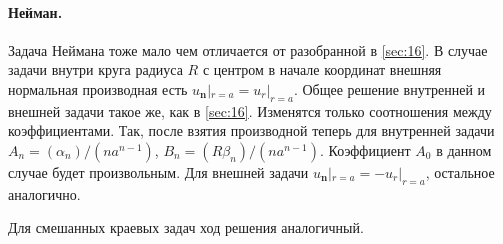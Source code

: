 \paragraph{Нейман.} 
Задача Неймана тоже мало чем отличается от разобранной в \ref{sec:16}. В случае задачи внутри круга радиуса $ R $ с центром
в начале координат внешняя нормальная производная есть $ u_{\mathbf n}|_{r = a}
= u_r|_{r = a}$. Общее решение внутренней и внешней задачи такое же, как в
\ref{sec:16}. Изменятся только соотношения между коэффициентами. Так, после
взятия производной теперь для
внутренней задачи $
A_n = (\alpha_n)/(na^{n-1}) $, $ B_n = (R\beta_n)/(na^{n-1}) $. Коэффициент $
A_0 $ в данном случае будет произвольным. Для внешней задачи $
u_{\mathbf n}|_{r=a} = -u_r|_{r=a} $, остальное аналогично.

Для смешанных краевых задач ход решения аналогичный.